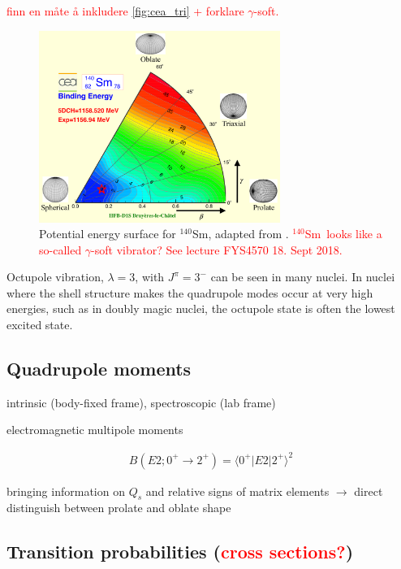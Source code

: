 \documentclass[twoside,english]{uiofysmaster/uiofysmaster}
\newcommand{\Sm}{$^{140}$Sm} %
\newcommand{\ga}{$\gamma$}
\let\orgautoref\autoref
\renewcommand{\autoref}
        {%
		 \def\sectionautorefname{Section}%
		 \def\subsectionautorefname{Section}%
		 \def\subsubsectionautorefname{Section}%
		 \def\chapterautorefname{Chapter}%
          \orgautoref}
\begin{document}
\textcolor{red}{finn en måte å inkludere \autoref{fig:cea_tri} + forklare \ga-soft.}

\begin{figure}[ht]
	\centering
	\includegraphics[width=0.7\textwidth]{Images/Triaxial-map-drawing.png}
	\caption{Potential energy surface for \Sm, adapted from \cite{Hilaire2007, CEA}. \textcolor{red}{\Sm\ looks like a so-called \ga-soft vibrator? See lecture FYS4570 18. Sept 2018.}}
	\label{fig:cea_tri}
\end{figure}

Octupole vibration, $\lambda = 3$, with $J^\pi = 3^-$ can be seen in many nuclei.
In nuclei where the shell structure makes the quadrupole modes occur at very high energies, such as in doubly magic nuclei, the octupole state is often the lowest excited state.







\subsection{Quadrupole moments}

intrinsic (body-fixed frame), spectroscopic (lab frame)

electromagnetic multipole moments

\begin{align}
	B(E2; 0^+ \rightarrow 2^+) = \langle 0^+| E2 | 2^+ \rangle^2
\end{align}

bringing information on $Q_s$ and relative signs of matrix elements $\rightarrow$ direct distinguish between prolate and oblate shape

\subsection{Transition probabilities (\textcolor{red}{cross sections?})}
\end{document}
